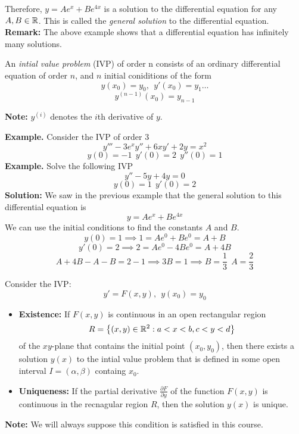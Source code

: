 \documentclass[openany]{report}
\begin{document}
Therefore, $y = Ae^x + Be^{4x}$ is a solution to the differential equation for any $A,B \in \mathbb{R}$. This is called the \emph{general solution} to the differential equation. \\[2ex]
\textbf{Remark:} The above example shows that a differential equation has infinitely many solutions.
\begin{definition}
    An \emph{intial value problem} (IVP) of order n consists of an ordinary differential equation of order $n$, and $n$ initial coniditions of the form 
    \[y(x_0) = y_0, \ \ y'(x_0) = y_1 \ldots\]
    \[y^{(n-1)}(x_0) = y_{n-1}\]
\end{definition}
\begin{center}
    \textbf{Note:} $y^{(i)}$ denotes the $i$th derivative of $y$.
\end{center}
\textbf{Example.} Consider the IVP of order 3 
\[y''' - 3e^xy'' + 6xy' + 2y = x^2\]
\[y(0) = -1 \ \ y'(0) = 2 \ \ y''(0) = 1\]
\textbf{Example.} Solve the following IVP
\[y'' - 5y + 4y = 0\]
\[y(0) = 1 \ \ y'(0) = 2\]
\textbf{Solution:} We saw in the previous example that the general solution to this differential equation is 
\[y = Ae^x + Be^{4x}\]
We can use the initial conditions to find the constants $A$ and $B$.
\[y(0) = 1 \implies 1 = Ae^0 + Be^0 = A + B\]
\[y'(0) = 2 \implies 2 = Ae^0 - 4Be^0 = A + 4B\]
\[A + 4B - A - B = 2 - 1 \implies 3B = 1 \implies B = \frac{1}{3} \ \ A = \frac{2}{3}\]
\begin{theorem}
    Consider the IVP: 
    \[y' = F(x,y), \ \ y(x_0) = y_0\]
    \begin{itemize}
        \item \textbf{Existence:} If $F(x,y)$ is continuous in an open rectangular region 
        \[R = \left\{(x,y) \in \mathbb{R}^2: a < x < b, c < y < d\right\}\]
        of the $xy$-plane that contains the initial point $(x_0, y_0)$, then there exists a solution $y(x)$ to the intial value problem that is defined in some open interval $I = (\alpha, \beta)$ containg $x_0$.
        \item \textbf{Uniqueness:} If the partial derivative $\frac{\partial F}{\partial y}$ of the function $F(x,y)$ is continuous in the recnagular region $R$, then the solution $y(x)$ is unique.
    \end{itemize}
\end{theorem}
\begin{center}
    \textbf{Note:} We will always suppose this condition is satisfied in this course.
\end{center}
\end{document}
